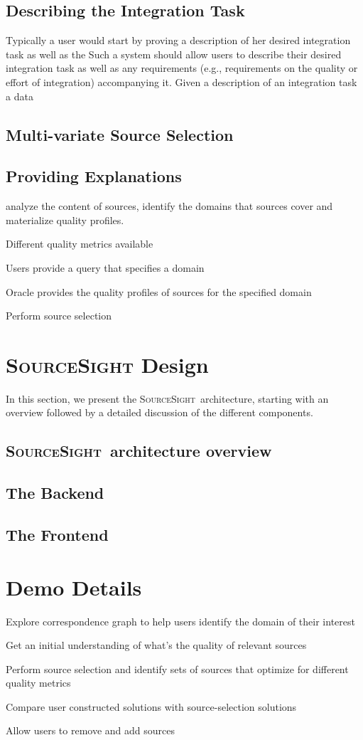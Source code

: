 \documentclass{vldb}
\newcommand\system{\textsc{SourceSight}}
\begin{document}
\subsection{Describing the Integration Task}
Typically a user would start by proving a description of her desired integration task as well as the 
  Such a system should allow users to describe their desired integration task as well as any requirements (e.g., requirements on the quality or effort of integration) accompanying it. Given a description of an integration task a data 


\subsection{Multi-variate Source Selection}

\subsection{Providing Explanations}

analyze the content of sources, identify the domains that sources cover and materialize quality profiles. 

Different quality metrics available 

Users provide a query that specifies a domain

Oracle provides the quality profiles of sources for the specified domain

Perform source selection

\section{{\Large \system} Design}
In this section, we present the \system~architecture, starting with an overview followed by a detailed discussion of the different components. 
\subsection{{\large \system}~architecture overview}

\subsection{The Backend}
\subsection{The Frontend}

\section{Demo Details}

Explore correspondence graph to help users identify the domain of their interest

Get an initial understanding of what's the quality of relevant sources

Perform source selection and identify sets of sources that optimize for different
quality metrics

Compare user constructed solutions with source-selection solutions

Allow users to remove and add sources



\end{document}
